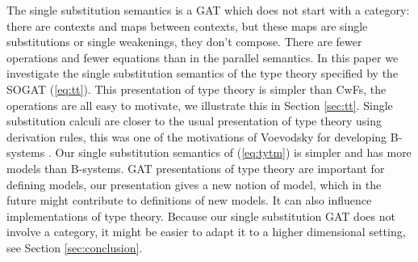 \documentclass[sigplan,10pt,anonymous,review]{acmart}\settopmatter{printfolios=true,printccs=false,printacmref=false}
\begin{document}
The single substitution semantics is a GAT which does not start with a
category: there are contexts and maps between contexts, but these maps
are single substitutions or single weakenings, they don't
compose. There are fewer operations and fewer equations than in the
parallel semantics. In this paper we investigate the single
substitution semantics of the type theory specified by the SOGAT
(\ref{eq:tt}). This presentation of type theory is simpler than CwFs,
the operations are all easy to motivate, we illustrate this in Section
\ref{sec:tt}. Single substitution calculi are closer to the usual
presentation of type theory using derivation rules, this was one of
the motivations of Voevodsky for developing B-systems
\cite{AHRENS_EMMENEGGER_NORTH_RIJKE_2023}. Our single substitution
semantics of (\ref{eq:tytm}) is simpler and has more models than
B-systems. GAT presentations of type theory are important for defining
models, our presentation gives a new notion of model, which in the
future might contribute to definitions of new models. It can also
influence implementations of type theory. Because our single
substitution GAT does not involve a category, it might be easier to
adapt it to a higher dimensional setting, see Section
\ref{sec:conclusion}.
\end{document}
